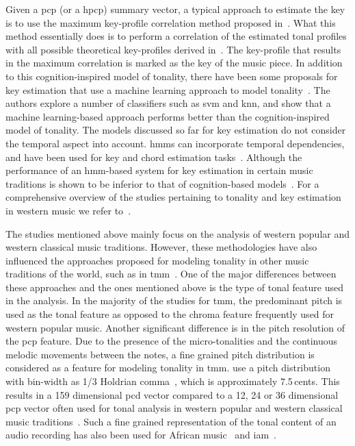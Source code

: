 Given a \gls{pcp} (or a \gls{hpcp}) summary vector, a typical approach to estimate the key is to use the maximum key-profile correlation method proposed in~\cite{krumhansl2001cognitive}. What this method essentially does is to perform a correlation of the estimated tonal profiles with all possible theoretical key-profiles derived in~\cite{KrumhanslKessler82}. The key-profile that results in the maximum correlation is marked as the key of the music piece. In addition to this cognition-inspired model of tonality, there have been some proposals for key estimation that use a machine learning approach to model tonality~\citep{gomez2004estimating}. The authors explore a number of classifiers such as \gls{svm} and \gls{knn}, and show that a machine learning-based approach performs better than the cognition-inspired model of tonality. The models discussed so far for key estimation do not consider the temporal aspect into account. \glspl{hmm} can incorporate temporal dependencies, and have been used for key and chord estimation tasks~\citep{noland2006key,peeters2006musical,papadopoulos2007large}. Although the performance of an \gls{hmm}-based system for key estimation in certain music traditions is shown to be inferior to that of cognition-based models~\citep{peeters2006musical}. For a comprehensive overview of the studies pertaining to tonality and key estimation in western music we refer to~\cite{gomez2006tonal}.

The studies mentioned above mainly focus on the analysis of western popular and western classical music traditions. However, these methodologies have also influenced the approaches proposed for modeling tonality in other music traditions of the world, such as in \gls{tmm}~\citep{gedik2010pitch,gedik2009evaluation,bozkurt2008automatic}. One of the major differences between these approaches and the ones mentioned above is the type of tonal feature used in the analysis. In the majority of the studies for \gls{tmm}, the predominant pitch is used as the tonal feature as opposed to the chroma feature frequently used for western popular music. Another significant difference is in the pitch resolution of the \gls{pcp} feature. Due to the presence of the micro-tonalities and the continuous melodic movements between the notes, a fine grained pitch distribution is considered as a feature for modeling tonality in \gls{tmm}. \cite{bozkurt2008automatic,gedik2010pitch} use a pitch distribution with bin-width as 1/3 Holdrian comma~\citep{akkocc2002non}, which is approximately 7.5\,cents. This results in a 159 dimensional \gls{pcd} vector compared to a 12, 24 or 36 dimensional \gls{pcp} vector often used for tonal analysis in western popular and western classical music traditions~\citep{gomez2006tonal}. Such a fine grained representation of the tonal content of an audio recording has also been used for African music~\citep{moelants2009exploring} and \acrfull{iam}~\citep{chordia2013joint}. 

